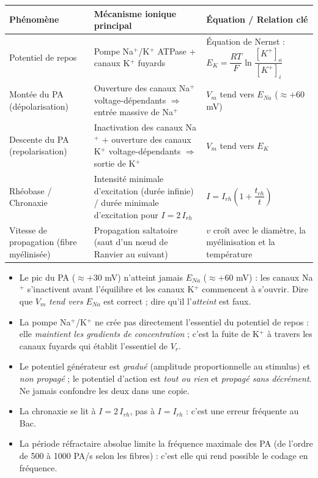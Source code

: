 \documentclass[11pt]{article}
\begin{document}
\begin{aretenir}
\begin{center}
\begin{tabularx}{\linewidth}{|l|X|X|}
\hline
\rowcolor{popblueL}
\textbf{Phénomène} & \textbf{Mécanisme ionique principal} & \textbf{Équation / Relation clé} \\
\hline
Potentiel de repos & Pompe Na$^+$/K$^+$ ATPase + canaux K$^+$ fuyards & Équation de Nernst : $E_K = \dfrac{RT}{F}\ln\dfrac{[K^+]_o}{[K^+]_i}$ \\
\hline
Montée du PA (dépolarisation) & Ouverture des canaux Na$^+$ voltage-dépendants $\Rightarrow$ entrée massive de Na$^+$ & $V_m$ tend vers $E_{Na}$ ($\approx +60$ mV) \\
\hline
Descente du PA (repolarisation) & Inactivation des canaux Na$^+$ + ouverture des canaux K$^+$ voltage-dépendants $\Rightarrow$ sortie de K$^+$ & $V_m$ tend vers $E_K$ \\
\hline
Rhéobase / Chronaxie & Intensité minimale d'excitation (durée infinie) / durée minimale d'excitation pour $I = 2\,I_{rh}$ & $I = I_{rh}\left(1 + \dfrac{t_{ch}}{t}\right)$ \\
\hline
Vitesse de propagation (fibre myélinisée) & Propagation saltatoire (saut d'un nœud de Ranvier au suivant) & $v$ croît avec le diamètre, la myélinisation et la température \\
\hline
\end{tabularx}
\end{center}
\end{aretenir}

\begin{attention}
\begin{itemize}
    \item Le pic du PA ($\approx +30$ mV) n'atteint jamais $E_{Na}$ ($\approx +60$ mV) : les canaux Na$^+$ s'inactivent avant l'équilibre et les canaux K$^+$ commencent à s'ouvrir. Dire que $V_m$ \emph{tend vers} $E_{Na}$ est correct ; dire qu'il l'\emph{atteint} est faux.
    \item La pompe Na$^+$/K$^+$ ne crée pas directement l'essentiel du potentiel de repos : elle \emph{maintient les gradients de concentration} ; c'est la fuite de K$^+$ à travers les canaux fuyards qui établit l'essentiel de $V_r$.
    \item Le potentiel générateur est \emph{gradué} (amplitude proportionnelle au stimulus) et \emph{non propagé} ; le potentiel d'action est \emph{tout ou rien} et \emph{propagé sans décrément}. Ne jamais confondre les deux dans une copie.
    \item La chronaxie se lit à $I = 2\,I_{rh}$, pas à $I = I_{rh}$ : c'est une erreur fréquente au Bac.
    \item La période réfractaire absolue limite la fréquence maximale des PA (de l'ordre de 500 à 1000 PA/s selon les fibres) : c'est elle qui rend possible le codage en fréquence.
\end{itemize}
\end{attention}
\end{document}
